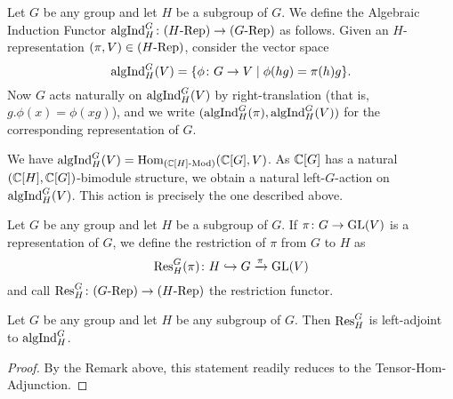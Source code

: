 \documentclass[../main.tex]{subfiles}
\begin{document}
\begin{defi}
  Let $G$ be any group and let $H$ be a subgroup of $G$. We define the Algebraic
  Induction Functor $\mathrm{algInd}_H^G\colon {({H}\textnormal-\allowbreak\mathrm{Rep})} \to {({G}\textnormal-\allowbreak\mathrm{Rep})}$ as follows. Given an
  $H$-representation $(\pi, V)\in {({H}\textnormal-\allowbreak\mathrm{Rep})}$, consider the vector space
  \begin{equation*}
    \mathrm{algInd}_H^G(V) = \{\phi\colon G \to V \mid \phi(hg) = \pi(h) g\}.
  \end{equation*}
  Now $G$ acts naturally on $\mathrm{algInd}_H^G(V)$ by right-translation (that is, 
  $g.\phi(x) = \phi(xg)$), and we write
  $(\mathrm{algInd}_H^G(\pi),\mathrm{algInd}_H^G(V))$ for the corresponding representation of $G$.
\end{defi}

\begin{rmk} 
  We have $\mathrm{algInd}_H^G(V) = \operatorname{Hom}_{{({\mathbb{C}[H]}\textnormal-\allowbreak\mathrm{Mod})}}(\mathbb{C}[G], V)$. As
  $\mathbb{C}[G]$ has a natural $(\mathbb{C}[H], \mathbb{C}[G])$-bimodule structure, we obtain a natural
  left-$G$-action on $\mathrm{algInd}_H^G(V)$. This action is precisely the one
  described above.
\end{rmk}

\begin{defi}\label{def:RestrictionFunctor}
  Let $G$ be any group and let $H$ be a subgroup of $G$.
  If $\pi\colon G \to \operatorname{GL}(V)$ is a representation of $G$, we define the
  restriction of $\pi$ from $G$ to $H$ as
  \begin{equation*}
    \mathrm{Res}_H^G(\pi)\colon H \hookrightarrow G \xrightarrow{\pi} \operatorname{GL}(V)
  \end{equation*}
  and call $\mathrm{Res}_H^G\colon {({G}\textnormal-\allowbreak\mathrm{Rep})} \to {({H}\textnormal-\allowbreak\mathrm{Rep})}$ the restriction functor.  
\end{defi}

\begin{lem}\label{lem:AlgFrobRec}
  Let $G$ be any group and let $H$ be any subgroup of $G$. Then 
  $\mathrm{Res}_H^G$ is left-adjoint to $\mathrm{algInd}_H^G$.
\begin{proof}
  By the Remark above, this statement readily reduces to the Tensor-Hom-Adjunction.
\end{proof}
\end{lem}
\end{document}
